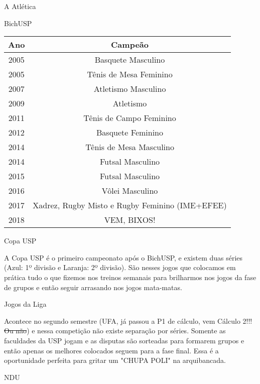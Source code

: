 \begin{secao}{A Atlética}
\begin{subsecao}{BichUSP}
\begin{center}
  \begin{tabular}{c|c}
    \hline
    Ano & Campeão\\
    \hline
    2005 & Basquete Masculino \\
    2005 & Tênis de Mesa Feminino \\
    2007 & Atletismo Masculino\\
    2009 & Atletismo\\
    2011 & Tênis de Campo Feminino\\
    2012 & Basquete Feminino\\
    2014 & Tênis de Mesa Masculino\\
    2014 & Futsal Masculino\\
    2015 & Futsal Masculino\\
    2016 & Vôlei Masculino\\
    2017 & Xadrez, Rugby Misto e Rugby Feminino (IME+EFEE)\\
    2018 & VEM, BIXOS!\\
    \hline
  \end{tabular}
\end{center}

\end{subsecao}
\begin{subsecao}{Copa USP}

A Copa USP é o primeiro campeonato após o BichUSP, e existem duas séries (Azul:
1º divisão e Laranja: 2º divisão). São nesses jogos que colocamos em prática
tudo o que fizemos nos treinos semanais para brilharmos nos jogos da fase de
grupos e então seguir arrasando nos jogos mata-matas.

\end{subsecao}
\begin{subsecao}{Jogos da Liga}

Acontece no segundo semestre (UFA, já passou a P1 de cálculo, vem Cálculo 2!!!
\sout{Ou não}) e nessa competição não existe separação por séries. Somente as
faculdades da USP jogam e as disputas são sorteadas para formarem grupos e
então apenas os melhores colocados seguem para a fase final. Essa é a
oportunidade perfeita para gritar um "CHUPA POLI" na arquibancada.

\end{subsecao}
\begin{subsecao}{NDU}


\end{subsecao}
\end{secao}
